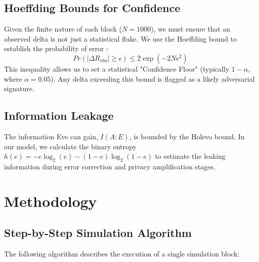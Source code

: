\documentclass[journal,onecolumn,12pt,draftclsnofoot]{IEEEtran}
\begin{document}
\subsection{Hoeffding Bounds for Confidence}
Given the finite nature of each block ($N=1000$), we must ensure that an observed delta is not just a statistical fluke. We use the Hoeffding bound to establish the probability of error \cite{hoeffding}:
\begin{equation}
    Pr(|\Delta R_{\text{obs}}| \ge \epsilon) \le 2 \exp(-2N\epsilon^2)
\end{equation}
This inequality allows us to set a statistical "Confidence Floor" (typically $1-\alpha$, where $\alpha=0.05$). Any delta exceeding this bound is flagged as a likely adversarial signature.

\subsection{Information Leakage}
The information Eve can gain, $I(A:E)$, is bounded by the Holevo bound. In our model, we calculate the binary entropy $h(e) = -e\log_2(e) - (1-e)\log_2(1-e)$ to estimate the leaking information during error correction and privacy amplification stages.

\newpage

\section{Methodology}

\subsection{Step-by-Step Simulation Algorithm}
The following algorithm describes the execution of a single simulation block:
\end{document}
